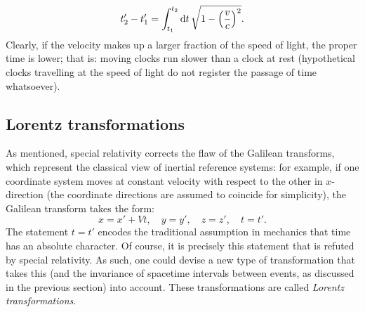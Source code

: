 \begin{equation}
    t'_2 - t'_1 = \int^{t_2}_{t_1} \dd{t} \sqrt{1 - \qty(\frac{v}{c})^2}.
    \label{eq:proper_time}
\end{equation}
Clearly, if the velocity makes up a larger fraction of the speed of light, the proper time is lower; that is: moving clocks run slower than a clock at rest (hypothetical clocks travelling at the speed of light do not register the passage of time whatsoever). 

\subsection{Lorentz transformations}
As mentioned, special relativity corrects the flaw of the Galilean transforms, which represent the classical view of inertial reference systems: for example, if one coordinate system moves at constant velocity with respect to the other in \(x\)-direction (the coordinate directions are assumed to coincide for simplicity), the Galilean transform takes the form:
\begin{equation}
    x = x' + Vt, \quad y = y', \quad z = z',\quad t = t'.
    \label{eq:galilean_transform}
\end{equation}
The statement \(t = t'\) encodes the traditional assumption in mechanics that time has an absolute character. Of course, it is precisely this statement that is refuted by special relativity. As such, one could devise a new type of transformation that takes this (and the invariance of spacetime intervals between events, as discussed in the previous section) into account. These transformations are called \emph{Lorentz transformations}. 

